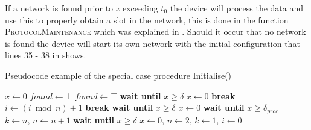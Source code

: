 If a network is found prior to \textit{x} exceeding $t_0$ the device will process the data and use this to properly obtain a slot in the network, this is done in the function \textsc{ProtocolMaintenance} which was explained in .
Should it occur that no network is found the device will start its own network with the initial configuration that lines 35 - 38 in  shows.

\begin{algorithm}[ht]
\caption{Pseudocode example of the special case procedure Initialise()}
\label{lst:setupCCRC}
\begin{algorithmic}[1]
    \State $x \gets 0$
    \State $found \gets \bot$
            \State {} 
            \State $found \gets \top$
            \State \textbf{wait until } $x \ge \delta$
            \State $x \gets 0$
            \State \textbf{break}
        \EndIf                                        
    \EndWhile
            \State $i \gets (i \bmod n) + 1$
                    \State {}
                    \State \textbf{break}
                \EndIf
            \EndWhile
            \State \textbf{wait until } $x \ge \delta$
            \State $x \gets 0$ 
        \EndWhile
        \State \textbf{wait until } $x \ge \delta_{proc}$
        \State $k \gets n,\, n \gets n+1$ 
        \State {}  
        \State \textbf{wait until } $x \ge \delta$ 
    \Else
        \State $x \gets 0,\, n \gets 2,\, k \gets 1,\, i \gets 0$ 
    \EndIf
    \State {} 
\EndProcedure        
\end{algorithmic}    
\end{algorithm} 


